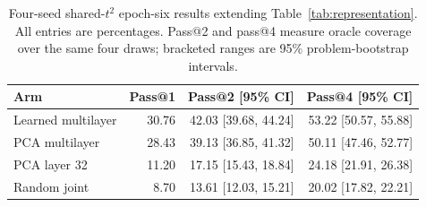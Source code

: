 \begin{table}[t]
\caption{Four-seed shared-$t^2$ epoch-six results extending Table~\ref{tab:representation}. All entries are percentages. Pass@2 and pass@4 measure oracle coverage over the same four draws; bracketed ranges are 95\% problem-bootstrap intervals.}
\label{tab:shared2multisample}
\centering\small
\setlength{\tabcolsep}{4pt}
\begin{tabular}{lrrr}
\toprule
Arm & Pass@1 & Pass@2 [95\% CI] & Pass@4 [95\% CI] \\
\midrule
Learned multilayer & 30.76 & 42.03 [39.68, 44.24] & 53.22 [50.57, 55.88] \\
PCA multilayer & 28.43 & 39.13 [36.85, 41.32] & 50.11 [47.46, 52.77] \\
PCA layer 32 & 11.20 & 17.15 [15.43, 18.84] & 24.18 [21.91, 26.38] \\
Random joint & 8.70 & 13.61 [12.03, 15.21] & 20.02 [17.82, 22.21] \\
\bottomrule
\end{tabular}
\end{table}
